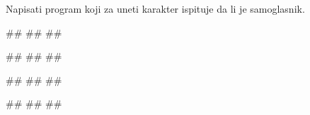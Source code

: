 \begin{Exercise}[label=v1.2_11] 
Napisati program koji za uneti karakter ispituje da li je samoglasnik.

\begin{miditest}
\begin{upotreba}{1}
#\naslovInt#
##
##
\end{upotreba}
\end{miditest}
\begin{miditest}
\begin{upotreba}{2}
#\naslovInt#
##
##
\end{upotreba}
\end{miditest}

\begin{miditest}
\begin{upotreba}{3}
#\naslovInt#
##
##
\end{upotreba}
\end{miditest}
\begin{miditest}
\begin{upotreba}{4}
#\naslovInt#
##
##
\end{upotreba}
\end{miditest}

\end{Exercise}
\begin{Answer}[ref=v1.2_11]
\end{Answer}

